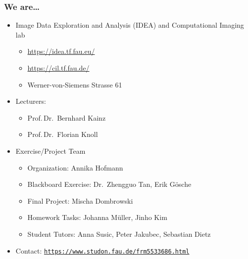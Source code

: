 

\subtitle{Motivation}




\nocite{*}

\frame[plain,c]{\titlepage} %

\begin{frame}
	\frametitle{We are\ldots}
	\begin{itemize}
		\setlength\itemsep{0.3cm}
		\item Image Data Exploration and Analysis (IDEA) and Computational Imaging lab
		\begin{itemize}
			\item \url{https://idea.tf.fau.eu/}
			\item \url{https://cil.tf.fau.de/}
			\item Werner-von-Siemens Strasse 61
		\end{itemize}
		\item Lecturers:
		\begin{itemize}
			\item Prof.\,Dr.\ Bernhard Kainz
			\item Prof.\,Dr.\ Florian Knoll
		\end{itemize}
		\item Exercise/Project Team
		\begin{itemize}
			\item Organization: \tabto{3cm} Annika Hofmann
			\item Blackboard Exercise: \tabto{3cm} Dr.\ Zhengguo Tan, Erik G\"osche
			\item Final Project: \tabto{3cm} Mischa Dombrowski
			\item Homework Tasks: \tabto{3cm} Johanna M\"uller, Jinho Kim
			\item Student Tutors: \tabto{3cm} Anna Susic, Peter Jakubec, Sebastian Dietz
		\end{itemize}
		\item Contact: \texttt{\url{https://www.studon.fau.de/frm5533686.html}}
	\end{itemize}
\end{frame}

